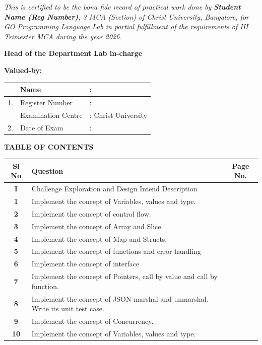 \documentclass[12pt,a4paper]{article}
\begin{document}
\vspace{1.5cm}
\begin{center}
    \begin{minipage}{0.9\textwidth}
        \large \textit{This is certified to be the bona fide record of practical work done by \textbf{Student Name (Reg Number)}, 3 MCA (Section) of Christ University, Bangalore, for GO Programming Language Lab in partial fulfillment of the requirements of III Trimester MCA during the year 2026.}
    \end{minipage}
\end{center}

\vspace{4cm}
\noindent
\textbf{Head of the Department} \hfill \textbf{Lab in-charge}

\vspace{3cm}
\noindent
\textbf{Valued-by:} \\
\begin{tabular}{|p{1cm}|p{6cm}|p{6cm}|}
\hline
 & Name & : \\ \hline
1. & Register Number & : \\ \hline
 & Examination Centre & : Christ University \\ \hline
2. & Date of Exam & : \\ \hline
\end{tabular}

\newpage
\begin{center}
    {\Huge \textbf{TABLE OF CONTENTS}}
\end{center}
\vspace{1cm}

\begin{longtable}{|c|p{10cm}|c|}
\hline
\textbf{Sl No} & \centering \textbf{Question} & \textbf{Page No.} \\ \hline
\textbf{I} & Challenge Exploration and Design Intend Description & \\ \hline
\textbf{1} & Implement the concept of Variables, values and type. & \\ \hline
\textbf{2} & Implement the concept of control flow. & \\ \hline
\textbf{3} & Implement the concept of Array and Slice. & \\ \hline
\textbf{4} & Implement the concept of Map and Structs. & \\ \hline
\textbf{5} & Implement the concept of functions and error handling & \\ \hline
\textbf{6} & Implement the concept of interface & \\ \hline
\textbf{7} & Implement the concept of Pointers, call by value and call by function. & \\ \hline
\textbf{8} & Implement the concept of JSON marshal and unmarshal. Write its unit test case. & \\ \hline
\textbf{9} & Implement the concept of Concurrency. & \\ \hline
\textbf{10} & Implement the concept of Variables, values and type. & \\ \hline
\end{longtable}
\end{document}
